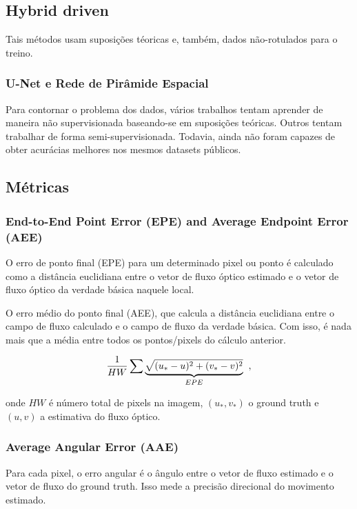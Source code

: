 \documentclass[12pt, a4paper]{article}
\begin{document}
\subsection{Hybrid driven}

Tais métodos usam suposições téoricas e, também, dados não-rotulados para o treino.

\subsubsection{U-Net e Rede de Pirâmide Espacial}

Para contornar o problema dos dados, vários trabalhos tentam aprender de maneira não supervisionada baseando-se em suposições teóricas. Outros tentam trabalhar de forma semi-supervisionada. Todavia, ainda não foram capazes de obter acurácias melhores nos mesmos datasets públicos.

\subsection{Métricas}

\subsubsection{End-to-End Point Error (EPE) and Average Endpoint Error (AEE)}

O erro de ponto final (EPE) para um determinado pixel ou ponto é calculado como a distância euclidiana entre o vetor de fluxo óptico estimado e o vetor de fluxo óptico da verdade básica naquele local.

O erro médio do ponto final (AEE), que calcula a distância euclidiana entre o campo de fluxo calculado e o campo de fluxo da verdade básica. Com isso, é nada mais que a média entre todos os pontos/pixels do cálculo anterior.

\[ \frac{1}{HW} \sum \underbrace{\sqrt{(u_* - u)^2 + (v_* - v)^2}}_{EPE}\hspace{0.2cm}, \]

onde $HW$ é número total de pixels na imagem, $(u_*, v_*)$ o ground truth e $(u,v)$ a estimativa do fluxo óptico.

\subsubsection{Average Angular Error (AAE)}

Para cada pixel, o erro angular é o ângulo entre o vetor de fluxo estimado e o vetor de fluxo do ground truth. Isso mede a precisão direcional do movimento estimado.
\end{document}
